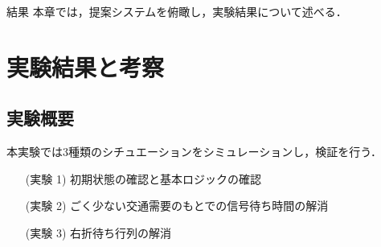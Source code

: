 \chapterhead
{結果}
{本章では，提案システムを俯瞰し，実験結果について述べる．}


\section{実験結果と考察}



\subsection{実験概要}
本実験では3種類のシチュエーションをシミュレーションし，検証を行う．
\begin{itemize}
  \item[(実験 1)]初期状態の確認と基本ロジックの確認
  \item[(実験 2)]ごく少ない交通需要のもとでの信号待ち時間の解消
  \item[(実験 3)]右折待ち行列の解消
\end{itemize}



\newpage
